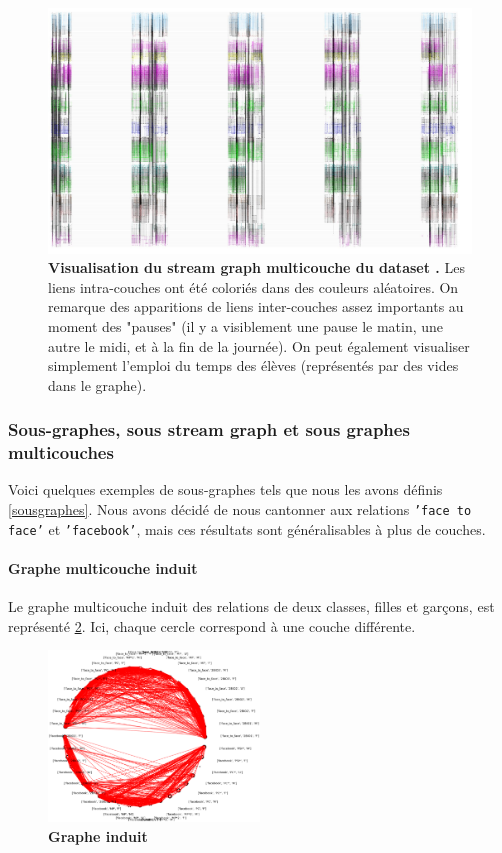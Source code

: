 \documentclass[11pt,a4paper]{article}
\theoremstyle{definition}
\theoremstyle{remark}
\theoremstyle{remark}
\def \stg {stream graph}
\def \stgm {stream graph multicouche}
\begin{document}
	\begin{figure}[h]
	\includegraphics[width=\textwidth]{lyceeentier.JPG}
	\caption{\textbf{Visualisation du \stgm{} du dataset \cite{cpge}.} Les liens intra-couches ont été coloriés dans des couleurs aléatoires. On remarque des apparitions de liens inter-couches assez importants au moment des "pauses" (il y a visiblement une pause le matin, une autre le midi, et à la fin de la journée). On peut également visualiser simplement l'emploi du temps des élèves (représentés par des vides dans le graphe).}
	\label{lyceeentier}
\end{figure}





\subsubsection{Sous-graphes, sous \stg{} et sous graphes multicouches}

Voici quelques exemples de sous-graphes tels que nous les avons définis \cref{sousgraphes}. Nous avons décidé de nous cantonner aux relations \texttt{'face to face'} et \texttt{'facebook'}, mais ces résultats sont généralisables à plus de couches. 

\paragraph{Graphe multicouche induit}
	Le graphe multicouche induit des relations de deux classes, filles et garçons, est représenté \cref{completinduit}. Ici, chaque cercle correspond à une couche différente.
	
\begin{figure}[H]
	\centering
	\includegraphics[width=0.5\textwidth]{tout.png}
	\caption{\textbf{Graphe induit}}
	\label{completinduit}
\end{figure}
\end{document}
